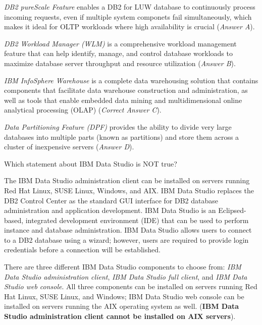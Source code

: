 \documentclass[answers, 11pt]{exam}
\begin{document}
\begin{questions}
\begin{solution}
\textit{DB2 pureScale Feature} enables a DB2 for LUW database to continuously process incoming requests,
even if multiple system componets fail simultaneously, which makes it ideal for OLTP workloads where 
high availability is crucial (\textit{Answer A}).
\par

\textit{DB2 Workload Manager (WLM)} is a comprehensive workload management feature that can help identify,
manage, and control database workloads to maximize database server throughput and resource utilization
(\textit{Answer B}).
\par

\textit{IBM InfoSphere Warehouse} is a complete data warehousing solution that contains components
that facilitate data warehouse construction and administration, as well as tools that enable
embedded data mining and multidimensional online analytical processing (OLAP) (\textit{Correct Answer C}).
\par

\textit{Data Partitioning Feature (DPF)} provides the ability to divide very large databases into 
multiple parts (known as partitions) and store them across a cluster of inexpensive servers 
(\textit{Answer D}).

\end{solution}

\question[1]
Which statement about IBM Data Studio is NOT true?
\begin{choices}
\CorrectChoice The IBM Data Studio administration client can be installed on servers running 
Red Hat Linux, SUSE Linux, Windows, and AIX.
\choice IBM Data Studio replaces the DB2 Control Center as the standard GUI interface for DB2 
database administration and application development.
\choice IBM Data Studio is an Eclipsed-based, integrated development environment (IDE) that can be 
used to perform instance and database administration.
\choice IBM Data Studio allows users to connect to a DB2 database using a wizard; however, users 
are required to provide login credentials before a connection will be established.
\end{choices}

\begin{solution}
There are three different IBM Data Studio components to choose from: \textit{IBM Data Studio
administration client}, \textit{IBM Data Studio full client}, and \textit{IBM Data Studio web console}.
All three components can be installed on servers running Red Hat Linux, SUSE Linux, and Windows; 
IBM Data Studio web console can be installed on servers running the AIX operating system as well.
(\textbf{IBM Data Studio administration client cannot be installed on AIX servers}).


\end{solution}
\end{questions}
\end{document}
